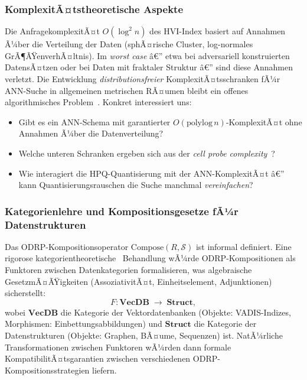 ﻿\documentclass[12pt,a4paper]{article}
\begin{document}
\subsubsection{KomplexitÃ¤tstheoretische Aspekte}

Die AnfragekomplexitÃ¤t $O(\log^2 n)$ des HVI-Index
basiert auf Annahmen Ã¼ber die Vertei\-lung der Daten
(sphÃ¤rische Cluster, log-normales GrÃ¶ÃŸenverhÃ¤ltnis).
Im \emph{worst case} â€” etwa bei adversariell konstruierten
DatensÃ¤tzen oder bei Daten mit fraktaler Struktur â€”
sind diese Annahmen verletzt. Die Entwicklung
\emph{distributionsfreier} KomplexitÃ¤tsschranken fÃ¼r
ANN-Suche in allgemeinen metrischen RÃ¤umen bleibt
ein offenes algorithmisches Problem~\cite{indyk2017approximate}.
Konkret interessiert uns:
\begin{itemize}[leftmargin=1.2em, itemsep=2pt]
  \item Gibt es ein ANN-Schema mit garantierter
        $O(\text{polylog}\,n)$-KomplexitÃ¤t ohne
        Annahmen Ã¼ber die Datenverteilung?
  \item Welche unteren Schranken ergeben sich aus der
        \emph{cell probe complexity}~\cite{miltersen1999data}?
  \item Wie interagiert die HPQ-Quantisierung mit der
        ANN-KomplexitÃ¤t â€” kann Quantisierungsrauschen
        die Suche manchmal \emph{vereinfachen}?
\end{itemize}

\subsubsection{Kategorienlehre und Kompositionsgesetze
              fÃ¼r Datenstrukturen}

Das ODRP-Kompositionsoperator
$\text{Compose}(R, \mathcal{S})$ ist informal definiert.
Eine rigorose kategorientheoretische~\cite{mac1978categories}
Behandlung wÃ¼rde ODRP-Kompositionen als Funktoren zwischen
Datenkategorien formalisieren, was algebraische GesetzmÃ¤ÃŸigkeiten
(AssoziativitÃ¤t, Einheitselement, Adjunktionen) sicherstellt:
\begin{equation}
  F: \mathbf{VecDB} \;\longrightarrow\; \mathbf{Struct},
\end{equation}
wobei $\mathbf{VecDB}$ die Kategorie der Vektordatenbanken
(Objekte: VADIS-Indizes, Morphismen: Einbettungsabbildungen)
und $\mathbf{Struct}$ die Kategorie der Datenstrukturen
(Objekte: Graphen, BÃ¤ume, Sequenzen) ist.
NatÃ¼rliche Transformationen zwischen Funktoren wÃ¼rden
dann formale KompatibilitÃ¤tsgarantien zwischen
verschiedenen ODRP-Kompositions\-strategien liefern.
\end{document}

